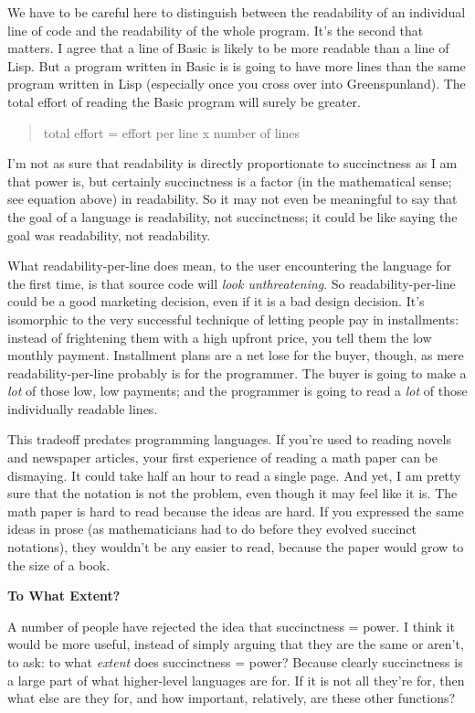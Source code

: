 We have to be careful here to distinguish between the readability of an
individual line of code and the readability of the whole program. It's
the second that matters. I agree that a line of Basic is likely to be
more readable than a line of Lisp. But a program written in Basic is is
going to have more lines than the same program written in Lisp
(especially once you cross over into Greenspunland). The total effort of
reading the Basic program will surely be greater.

\begin{quote}
total effort = effort per line x number of lines
\end{quote}

I'm not as sure that readability is directly proportionate to
succinctness as I am that power is, but certainly succinctness is a
factor (in the mathematical sense; see equation above) in readability.
So it may not even be meaningful to say that the goal of a language is
readability, not succinctness; it could be like saying the goal was
readability, not readability.

What readability-per-line does mean, to the user encountering the
language for the first time, is that source code will \emph{look
unthreatening}. So readability-per-line could be a good marketing
decision, even if it is a bad design decision. It's isomorphic to the
very successful technique of letting people pay in installments: instead
of frightening them with a high upfront price, you tell them the low
monthly payment. Installment plans are a net lose for the buyer, though,
as mere readability-per-line probably is for the programmer. The buyer
is going to make a \emph{lot} of those low, low payments; and the
programmer is going to read a \emph{lot} of those individually readable
lines.

This tradeoff predates programming languages. If you're used to reading
novels and newspaper articles, your first experience of reading a math
paper can be dismaying. It could take half an hour to read a single
page. And yet, I am pretty sure that the notation is not the problem,
even though it may feel like it is. The math paper is hard to read
because the ideas are hard. If you expressed the same ideas in prose (as
mathematicians had to do before they evolved succinct notations), they
wouldn't be any easier to read, because the paper would grow to the size
of a book.

\textbf{To What Extent?}

A number of people have rejected the idea that succinctness = power. I
think it would be more useful, instead of simply arguing that they are
the same or aren't, to ask: to what \emph{extent} does succinctness =
power? Because clearly succinctness is a large part of what higher-level
languages are for. If it is not all they're for, then what else are they
for, and how important, relatively, are these other functions?

